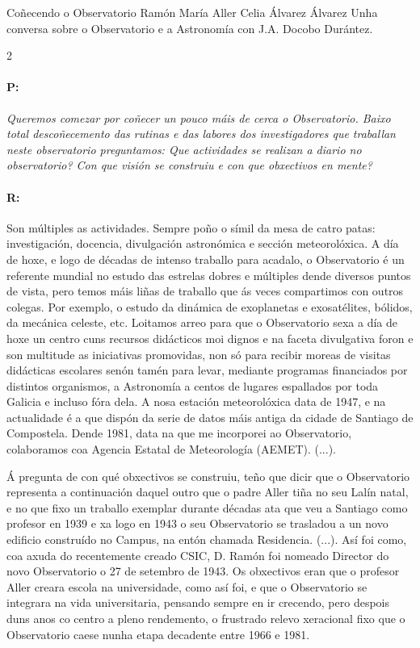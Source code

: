 \Titular*%
{entrevistas}
{Coñecendo o Observatorio Ramón María Aller}
{Celia Álvarez Álvarez}
{Unha conversa sobre o Observatorio e a Astronomía con J.A. Docobo Durántez.}


\begin{multicols}{2}

\paragraph{P:}

\textit{ Queremos comezar por coñecer un pouco máis de cerca o Observatorio.
Baixo total descoñecemento das rutinas e das labores dos investigadores que
traballan neste observatorio preguntamos: Que actividades se realizan a diario
no observatorio? Con que visión se construiu e con que obxectivos en mente? }

\paragraph{R:}

Son múltiples as actividades. Sempre poño o símil da mesa de
catro patas: investigación, docencia, divulgación astronómica e sección
meteorolóxica. A día de hoxe, e logo de décadas de intenso traballo para
acadalo, o Observatorio é un referente mundial no estudo das estrelas dobres e
múltiples dende diversos puntos de vista, pero temos máis liñas de traballo que
ás veces compartimos con outros colegas. Por exemplo, o estudo da dinámica de
exoplanetas e exosatélites, bólidos, da mecánica celeste, etc. Loitamos arreo
para que o Observatorio sexa a día de hoxe un centro cuns recursos didácticos
moi dignos e na faceta divulgativa foron e son multitude as iniciativas
promovidas, non só para recibir moreas de visitas didácticas escolares senón
tamén para levar, mediante programas financiados por distintos organismos, a
Astronomía a centos de lugares espallados por toda Galicia e incluso fóra dela.
A nosa estación meteorolóxica data de 1947, e na actualidade é a que dispón da
serie de datos máis antiga da cidade de Santiago de Compostela. Dende 1981,
data na que me incorporei ao Observatorio, colaboramos coa Agencia Estatal de
Meteorología (AEMET). (...).

Á pregunta de con qué obxectivos se construiu, teño que dicir que o
Observatorio representa a continuación daquel outro que o padre Aller tiña no
seu Lalín natal, e no que fixo un traballo exemplar durante décadas ata que veu
a Santiago como profesor en 1939 e xa logo en 1943 o seu Observatorio se
trasladou a un novo edificio construído no Campus, na entón chamada Residencia.
(...). Así foi como, coa axuda do recentemente creado CSIC, D. Ramón foi
nomeado Director do novo Observatorio o 27 de setembro de 1943. Os obxectivos
eran que o profesor Aller creara escola na universidade, como así foi, e que o
Observatorio se integrara na vida universitaria, pensando sempre en ir
crecendo, pero despois duns anos co centro a pleno rendemento, o frustrado
relevo xeracional fixo que o Observatorio caese nunha etapa decadente entre
1966 e 1981.


\end{multicols}

